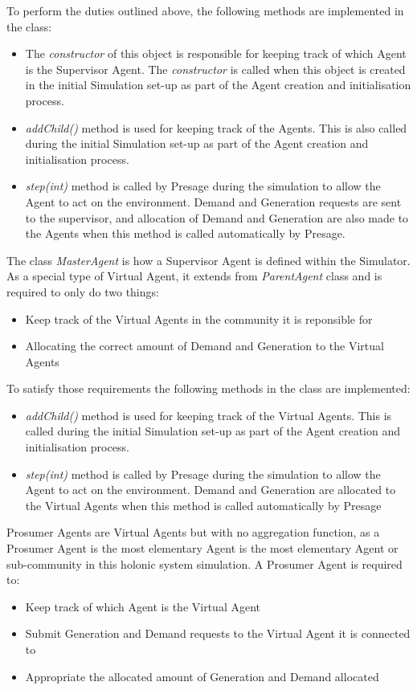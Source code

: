 To perform the duties outlined above, the following methods are implemented in the class:
\begin{itemize}
	\item The \textit{constructor} of this object is responsible for keeping track of which Agent is the Supervisor Agent. The \textit{constructor} is called when this object is created in the initial Simulation set-up as part of the Agent creation and initialisation process.
	\item \textit{addChild()} method is used for keeping track of the Agents. This is also called during the initial Simulation set-up as part of the Agent creation and initialisation process.
	\item \textit{step(int)} method is called by Presage during the simulation to allow the Agent to act on the environment. Demand and Generation requests are sent to the supervisor, and allocation of Demand and Generation are also made to the Agents when this method is called automatically by Presage.
\end{itemize}

The class \textit{MasterAgent} is how a Supervisor Agent is defined within the Simulator. As a special type of Virtual Agent, it extends from \textit{ParentAgent} class and is required to only do two things:
\begin{itemize}
	\item Keep track of the Virtual Agents in the community it is reponsible for
	\item Allocating the correct amount of Demand and Generation to the Virtual Agents
\end{itemize}

To satisfy those requirements the following methods in the class are implemented:
\begin{itemize}
	\item \textit{addChild()} method is used for keeping track of the Virtual Agents. This is called during the initial Simulation set-up as part of the Agent creation and initialisation process.
	\item \textit{step(int)} method is called by Presage during the simulation to allow the Agent to act on the environment. Demand and Generation are allocated to the Virtual Agents when this method is called automatically by Presage
\end{itemize}

Prosumer Agents are Virtual Agents but with no aggregation function, as a Prosumer Agent is the most elementary Agent is the most elementary Agent or sub-community in this holonic system simulation. A Prosumer Agent is required to:
\begin{itemize}
	\item Keep track of which Agent is the Virtual Agent
	\item Submit Generation and Demand requests to the Virtual Agent it is connected to
	\item Appropriate the allocated amount of Generation and Demand allocated
\end{itemize}

